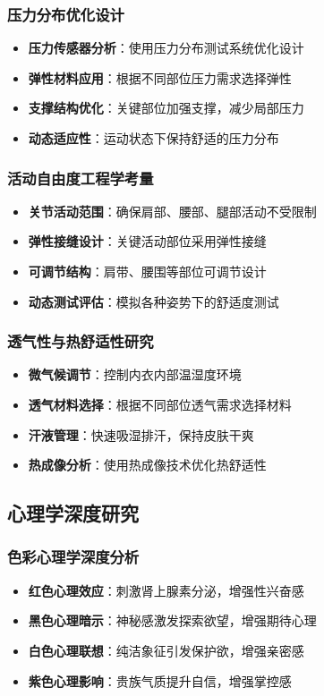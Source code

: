 \documentclass[12pt,UTF8]{ctexbook}
\begin{document}
\subsubsection{压力分布优化设计}
\begin{itemize}[leftmargin=2cm]
	\item \textbf{压力传感器分析}：使用压力分布测试系统优化设计
	\item \textbf{弹性材料应用}：根据不同部位压力需求选择弹性
	\item \textbf{支撑结构优化}：关键部位加强支撑，减少局部压力
	\item \textbf{动态适应性}：运动状态下保持舒适的压力分布
\end{itemize}

\subsubsection{活动自由度工程学考量}
\begin{itemize}[leftmargin=2cm]
	\item \textbf{关节活动范围}：确保肩部、腰部、腿部活动不受限制
	\item \textbf{弹性接缝设计}：关键活动部位采用弹性接缝
	\item \textbf{可调节结构}：肩带、腰围等部位可调节设计
	\item \textbf{动态测试评估}：模拟各种姿势下的舒适度测试
\end{itemize}

\subsubsection{透气性与热舒适性研究}
\begin{itemize}[leftmargin=2cm]
	\item \textbf{微气候调节}：控制内衣内部温湿度环境
	\item \textbf{透气材料选择}：根据不同部位透气需求选择材料
	\item \textbf{汗液管理}：快速吸湿排汗，保持皮肤干爽
	\item \textbf{热成像分析}：使用热成像技术优化热舒适性
\end{itemize}

\subsection{心理学深度研究}
\subsubsection{色彩心理学深度分析}
\begin{itemize}[leftmargin=2cm]
	\item \textbf{红色心理效应}：刺激肾上腺素分泌，增强性兴奋感
	\item \textbf{黑色心理暗示}：神秘感激发探索欲望，增强期待心理
	\item \textbf{白色心理联想}：纯洁象征引发保护欲，增强亲密感
	\item \textbf{紫色心理影响}：贵族气质提升自信，增强掌控感
\end{itemize}
\end{document}
